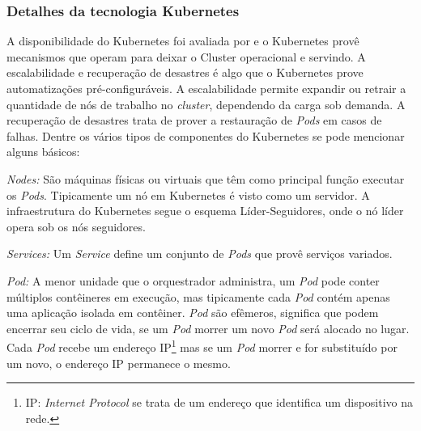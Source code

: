 \subsubsection{Detalhes da tecnologia Kubernetes}

A disponibilidade do Kubernetes foi avaliada por \cite{vayghan2021kubernetes} e o Kubernetes provê mecanismos que operam para deixar o Cluster operacional e servindo. A escalabilidade e recuperação de desastres é algo que o Kubernetes prove automatizações pré-configuráveis. A escalabilidade permite expandir ou retrair a quantidade de nós de trabalho no \textit{cluster}, dependendo da carga sob demanda. A recuperação de desastres trata de prover a restauração de \textit{Pods} em casos de falhas. Dentre os vários tipos de componentes do Kubernetes se pode mencionar alguns básicos:

\textit{Nodes:} São máquinas físicas ou virtuais que têm como principal função executar os \textit{Pods}. Tipicamente um nó em Kubernetes é visto como um servidor. A infraestrutura do Kubernetes segue o esquema Líder-Seguidores, onde o nó líder opera sob os nós seguidores.

\textit{Services:} Um \textit{Service} define um conjunto de \textit{Pods} que provê serviços variados.



\textit{Pod:} A menor unidade que o orquestrador administra, um \textit{Pod} pode conter múltiplos contêineres em execução, mas tipicamente cada \textit{Pod} contém apenas uma aplicação isolada em contêiner. \textit{Pod} são efêmeros, significa que podem encerrar seu ciclo de vida, se um \textit{Pod} morrer um novo \textit{Pod} será alocado no lugar. Cada \textit{Pod} recebe um endereço IP\footnote{IP: \textit{Internet Protocol} se trata de um endereço que identifica um dispositivo na rede.} mas se um \textit{Pod} morrer e for substituído por um novo, o endereço IP permanece o mesmo.


